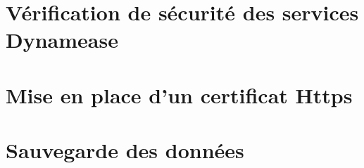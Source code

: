 \section{Vérification de sécurité des services Dynamease}

\section{Mise en place d'un certificat Https}

\section{Sauvegarde des données}